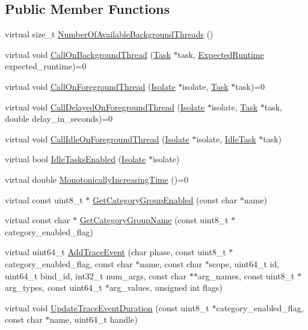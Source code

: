 \subsection*{Public Member Functions}
\begin{DoxyCompactItemize}
\item 
virtual size\+\_\+t \hyperlink{classv8_1_1_platform_a15886ccf5a6a085a2192b305709a527c}{Number\+Of\+Available\+Background\+Threads} ()
\item 
virtual void \hyperlink{classv8_1_1_platform_aa715e6839c1954b4e23b9d2df00bd3ea}{Call\+On\+Background\+Thread} (\hyperlink{classv8_1_1_task}{Task} $\ast$task, \hyperlink{classv8_1_1_platform_ace7f666b2b5995bb0e898e12fa660718}{Expected\+Runtime} expected\+\_\+runtime)=0
\item 
virtual void \hyperlink{classv8_1_1_platform_a8fa13959f919d1d3ff170bceea939915}{Call\+On\+Foreground\+Thread} (\hyperlink{classv8_1_1_isolate}{Isolate} $\ast$isolate, \hyperlink{classv8_1_1_task}{Task} $\ast$task)=0
\item 
virtual void \hyperlink{classv8_1_1_platform_a72bff12d95fbf2118279b0e8f53f8a4b}{Call\+Delayed\+On\+Foreground\+Thread} (\hyperlink{classv8_1_1_isolate}{Isolate} $\ast$isolate, \hyperlink{classv8_1_1_task}{Task} $\ast$task, double delay\+\_\+in\+\_\+seconds)=0
\item 
virtual void \hyperlink{classv8_1_1_platform_ae495999016432391f04d323452084b12}{Call\+Idle\+On\+Foreground\+Thread} (\hyperlink{classv8_1_1_isolate}{Isolate} $\ast$isolate, \hyperlink{classv8_1_1_idle_task}{Idle\+Task} $\ast$task)
\item 
virtual bool \hyperlink{classv8_1_1_platform_ad229642bf16a066d2e8d866dc128141e}{Idle\+Tasks\+Enabled} (\hyperlink{classv8_1_1_isolate}{Isolate} $\ast$isolate)
\item 
virtual double \hyperlink{classv8_1_1_platform_a6d4d7c2dcf6b0c7113099b97fa7f57b7}{Monotonically\+Increasing\+Time} ()=0
\item 
virtual const uint8\+\_\+t $\ast$ \hyperlink{classv8_1_1_platform_a5b81982481986c80d3f613dde54494da}{Get\+Category\+Group\+Enabled} (const char $\ast$name)
\item 
virtual const char $\ast$ \hyperlink{classv8_1_1_platform_a02dde4138b387f1ae2b53190cdac2afc}{Get\+Category\+Group\+Name} (const uint8\+\_\+t $\ast$category\+\_\+enabled\+\_\+flag)
\item 
virtual uint64\+\_\+t \hyperlink{classv8_1_1_platform_ab4ef5713fb5bec0f2fe0981745342364}{Add\+Trace\+Event} (char phase, const uint8\+\_\+t $\ast$category\+\_\+enabled\+\_\+flag, const char $\ast$name, const char $\ast$scope, uint64\+\_\+t id, uint64\+\_\+t bind\+\_\+id, int32\+\_\+t num\+\_\+args, const char $\ast$$\ast$arg\+\_\+names, const uint8\+\_\+t $\ast$arg\+\_\+types, const uint64\+\_\+t $\ast$arg\+\_\+values, unsigned int flags)
\item 
virtual void \hyperlink{classv8_1_1_platform_aa7ead571c0b19687635a930d9c67b73b}{Update\+Trace\+Event\+Duration} (const uint8\+\_\+t $\ast$category\+\_\+enabled\+\_\+flag, const char $\ast$name, uint64\+\_\+t handle)
\end{DoxyCompactItemize}


